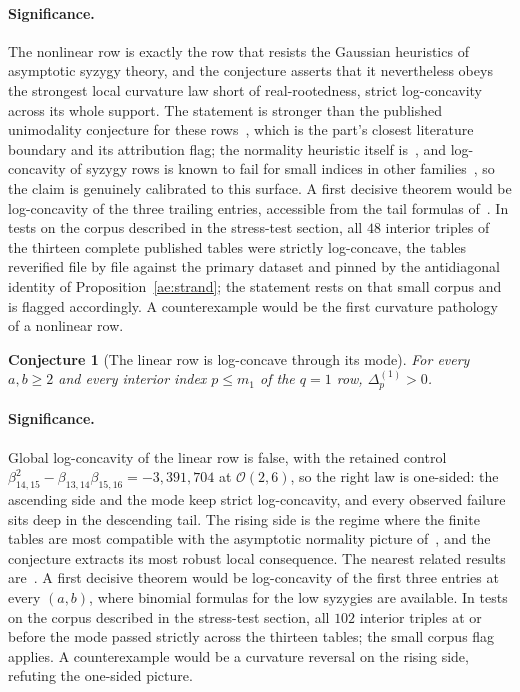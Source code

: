 \documentclass[11pt]{article}
\newtheorem{conjecture}{Conjecture}
\theoremstyle{definition}
\begin{document}
\paragraph{Significance.}
The nonlinear row is exactly the row that resists the Gaussian heuristics of asymptotic syzygy theory, and the conjecture asserts that it nevertheless obeys the strongest local curvature law short of real-rootedness, strict log-concavity across its whole support.  The statement is stronger than the published unimodality conjecture for these rows~\cite{BCEGLY22}, which is the part's closest literature boundary and its attribution flag; the normality heuristic itself is~\cite{EEL15}, and log-concavity of syzygy rows is known to fail for small indices in other families~\cite{Park25}, so the claim is genuinely calibrated to this surface.  A first decisive theorem would be log-concavity of the three trailing entries, accessible from the tail formulas of~\cite{Lem21}.  In tests on the corpus described in the stress-test section, all $48$ interior triples of the thirteen complete published tables were strictly log-concave, the tables reverified file by file against the primary dataset and pinned by the antidiagonal identity of Proposition~\ref{ae:strand}; the statement rests on that small corpus and is flagged accordingly.  A counterexample would be the first curvature pathology of a nonlinear row.

\begin{conjecture}[The linear row is log-concave through its mode]\label{ae8}
For every $a,b\ge2$ and every interior index $p\le m_1$ of the $q=1$ row, $\Delta^{(1)}_p>0$.
\end{conjecture}

\paragraph{Significance.}
Global log-concavity of the linear row is false, with the retained control $\beta_{14,15}^2-\beta_{13,14}\beta_{15,16}=-3{,}391{,}704$ at $\mathcal O(2,6)$, so the right law is one-sided: the ascending side and the mode keep strict log-concavity, and every observed failure sits deep in the descending tail.  The rising side is the regime where the finite tables are most compatible with the asymptotic normality picture of~\cite{EEL15}, and the conjecture extracts its most robust local consequence.  The nearest related results are~\cite{BCEGLY22,Lem21}.  A first decisive theorem would be log-concavity of the first three entries at every $(a,b)$, where binomial formulas for the low syzygies are available.  In tests on the corpus described in the stress-test section, all $102$ interior triples at or before the mode passed strictly across the thirteen tables; the small corpus flag applies.  A counterexample would be a curvature reversal on the rising side, refuting the one-sided picture.
\end{document}
